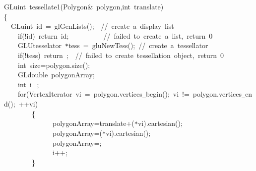 {
\noindent \ttfamily
\jttstylek GLuint~tessellate1\jttstylei (\jttstylek Polygon\&~polygon,int~translate\jttstylei )\\
\jttstylei \{\\
\jttstylea ~~\jttstylek GLuint~id~=~glGenLists\jttstylei (\jttstylei )\jttstylek ;~~\jttstyled //~create~a~display~list\\
\jttstylea ~~~~\jttstylee if\jttstylei (\jttstylek !id\jttstylei )~\jttstylee return~\jttstylek id;~~~~~~~~~~\jttstyled //~failed~to~create~a~list,~return~0\\
\jttstylea ~~~~\jttstylek GLUtesselator~\verb#*#tess~=~gluNewTess\jttstylei ()\jttstylek ;~\jttstyled //~create~a~tessellator\\
\jttstylea ~~~~\jttstylee if\jttstylei (\jttstylek !tess\jttstylei )~\jttstylee return~\jttstylek ;~~\jttstyled //~failed~to~create~tessellation~object,~return~0\\
\jttstylea ~~~~\jttstylej int~\jttstylek size=polygon.size\jttstylei ()\jttstylek ;\\
\jttstylea ~~~~\jttstylek GLdouble~polygonArray\jttstylek ;\\
\jttstylea ~~~~\jttstylej int~\jttstylek i=\jttstylek ;\\
\jttstylea ~~~~\jttstylee for\jttstylei (\jttstylek VertexIterator~vi~=~polygon.vertices\verb#_#begin\jttstylei ()\jttstylek ;~vi~!=~polygon.vertices\verb#_#end\jttstylei ()\jttstylek ;~++vi\jttstylei )\\
\jttstylea ~~~~~~~~\jttstylei \{\\
\jttstylea ~~~~~~~~~~~~~~\jttstylek polygonArray\jttstylek =translate+\jttstylei (\jttstylek \verb#*#vi\jttstylei )\jttstylek .cartesian\jttstylei (\jttstylei )\jttstylek ;\\
\jttstylea ~~~~~~~~~~~~~~\jttstylek polygonArray\jttstylek =\jttstylei (\jttstylek \verb#*#vi\jttstylei )\jttstylek .cartesian\jttstylei (\jttstylei )\jttstylek ;\\
\jttstylea ~~~~~~~~~~~~~~\jttstylek polygonArray\jttstylek =\jttstylek ;\\
\jttstylea ~~~~~~~~~~~~~~\jttstylek i++;\\
\jttstylea ~~~~~~~~\jttstylei \}\\
}
